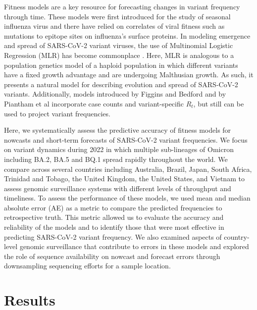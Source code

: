 \documentclass[11pt,oneside,letterpaper]{article}
\begin{document}
Fitness models are a key resource for forecasting changes in variant frequency through time.
These models were first introduced for the study of seasonal influenza virus \cite{luksza2014predictive, morris2018predictive, huddleston2020integrating} and there have relied on correlates of viral fitness such as mutations to epitope sites on influenza's surface proteins.
In modeling emergence and spread of SARS-CoV-2 variant viruses, the use of Multinomial Logistic Regression (MLR) has become commonplace \cite{annavajhala2021emergence, faria2021genomics, obermeyer2022analysis, susswein2023early}.
Here, MLR is analogous to a population genetics model of a haploid population in which different variants have a fixed growth advantage and are undergoing Malthusian growth.
As such, it presents a natural model for describing evolution and spread of SARS-CoV-2 variants.
Additionally, models introduced by Figgins and Bedford \cite{figgins2022sars} and by Piantham et al \cite{piantham2021estimating} incorporate case counts and variant-specific $R_t$, but still can be used to project variant frequencies.

Here, we systematically assess the predictive accuracy of fitness models for nowcasts and short-term forecasts of SARS-CoV-2 variant frequencies.
We focus on variant dynamics during 2022 in which multiple sub-lineages of Omicron including BA.2, BA.5 and BQ.1 spread rapidly throughout the world.
We compare across several countries including Australia, Brazil, Japan, South Africa, Trinidad and Tobago, the United Kingdom, the United States, and Vietnam to assess genomic surveillance systems with different levels of throughput and timeliness.
To assess the performance of these models, we used mean and median absolute error (AE) as a metric to compare the predicted frequencies to retrospective truth.
This metric allowed us to evaluate the accuracy and reliability of the models and to identify those that were most effective in predicting SARS-CoV-2 variant frequency.
We also examined aspects of country-level genomic surveillance that contribute to errors in these models and explored the role of sequence availability on nowcast and forecast errors through downsampling sequencing efforts for a sample location.

\section*{Results}
\end{document}
